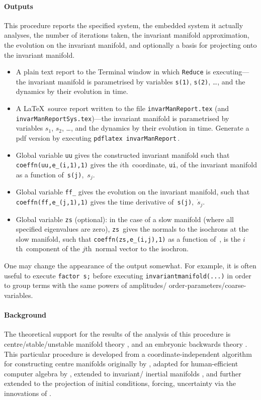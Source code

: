 \documentclass[11pt,a5paper]{article}
\begin{document}
\paragraph{Outputs}  This procedure reports the specified
system, the embedded system it actually analyses, the number
of iterations taken, the invariant manifold approximation,
the evolution on the invariant manifold, and optionally a
basis for projecting onto the invariant manifold.
\begin{itemize}
\item A plain text report to the Terminal window in which
\verb|Reduce| is executing---the invariant manifold is
parametrised by variables \verb|s(1)|, \verb|s(2)|, \ldots,
and the dynamics by their evolution in time.
\item A \LaTeX\ source report written to the file
\verb|invarManReport.tex| (and
\verb|invarManReportSys.tex|)---the invariant manifold is
parametrised by variables \(s_1\), \(s_2\), \ldots, and the
dynamics by their evolution in time.  Generate a pdf version
by executing \verb|pdflatex invarManReport|\,.
\item Global variable \verb|uu| gives the constructed 
invariant manifold such that \verb|coeffn(uu,e_(i,1),1)| 
gives the \(i\)th~coordinate, \verb|ui|, of the invariant 
manifold as a function of~\verb|s(j)|,~\(s_j\).
\item Global variable \verb|ff_| gives the evolution on the 
invariant manifold, such that \verb|coeffn(ff,e_(j,1),1)| 
gives the time derivative of~\verb|s(j)|,~\(\dot s_j\).
\item Global variable \verb|zs| (optional): in the case of 
a slow manifold (where all specified eigenvalues are zero), 
\verb|zs|~gives the normals to the isochrons at the slow 
manifold, such that \verb|coeffn(zs,e_(i,j),1)| as a 
function of~\sv, is the \(i\)th~component of the 
\(j\)th~normal vector to the isochron.
\end{itemize}
One may change the appearance of the output somewhat. For
example, it is often useful to execute  \verb|factor s;|
before executing \verb|invariantmanifold(...)| in order to
group terms with the same powers of amplitudes\slash
order-parameters\slash coarse-variables.


\paragraph{Background}
The theoretical support for the results of the analysis of
this procedure is centre\slash stable\slash unstable
manifold theory \cite[e.g.,][]{Carr81, Haragus2011,
Roberts2014a}, and an embryonic backwards theory
\cite[]{Roberts2018a}. This particular procedure is
developed from a coordinate-independent algorithm for
constructing centre manifolds originally by
\cite{Coullet83}, adapted for human-efficient computer
algebra by \cite{Roberts96a}, extended to invariant\slash
inertial manifolds \cite[]{Roberts89, Foias88b}, and further
extended to the projection of initial conditions, forcing,
uncertainty via the innovations of \cite{Roberts89b,
Roberts97b}.
\end{document}
